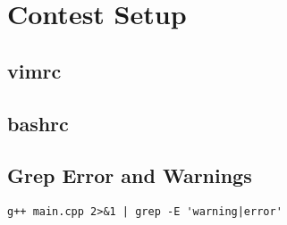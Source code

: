 \documentclass[10pt,oneside]{article}
\begin{document}
 

\begin{landscape}
\begin{multicols}{2}


\pagestyle{fancy}
\fancyhead[R]{\thepage}
\fancyfoot[R]{\thepage}

{
\fancyhead[R]{\thepage}
\fancyfoot[R]{\thepage}
}

\scriptsize
\tableofcontents
\pagestyle{fancy}

\vfill
\columnbreak



\section{Contest Setup}

\subsection{vimrc}


\subsection{bashrc}


\subsection{Grep Error and Warnings}

\begin{lstlisting}
g++ main.cpp 2>&1 | grep -E 'warning|error'
\end{lstlisting}


\end{multicols}
\end{landscape}
\end{document}

